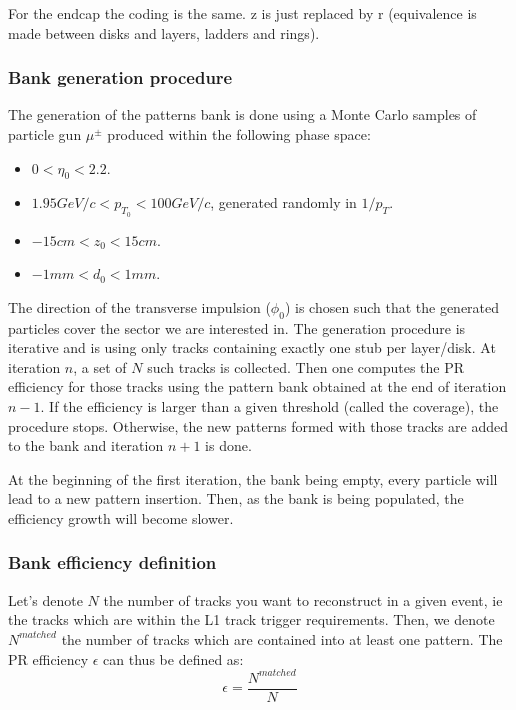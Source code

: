 \noindent For the endcap the coding is the same. z is just replaced by r (equivalence is made between disks and layers, ladders and rings). 

\subsubsection{Bank generation procedure}

\noindent The generation of the patterns bank is done using a Monte Carlo samples of particle gun $\mu^{\pm}$ produced within the following phase space:
\begin{itemize}
\item $0 < \eta_0 < 2.2$.
\item $1.95GeV/c < p_{T_0} < 100GeV/c$, generated randomly in $1/p_T$.
\item $-15cm < z_0 < 15cm$.
 \item $-1mm < d_0 < 1mm$.
\end{itemize}  

\noindent The direction of the transverse impulsion ($\phi_0$) is chosen such that the generated particles cover the sector we are interested in. The generation procedure is iterative and is using only tracks containing exactly one stub per layer/disk. At iteration $n$, a set of $N$ such tracks is collected. Then one computes the PR efficiency for those tracks using the pattern bank obtained at the end of iteration $n-1$. If the efficiency is larger than a given threshold (called the coverage), the procedure stops. Otherwise, the new patterns formed with those tracks are added to the bank and iteration $n+1$ is done. 

\noindent At the beginning of the first iteration, the bank being empty, every particle will lead to a new pattern insertion. Then, as the bank is being populated, the efficiency growth will become slower.

\subsubsection{Bank efficiency definition}

\noindent Let's denote $N$ the number of tracks you want to reconstruct in a given event, ie the tracks which are within the L1 track trigger requirements. Then, we denote $N^{matched}$ the number of tracks which are contained into at least one pattern. The PR efficiency $\epsilon$ can thus be defined as: 
\begin{equation}
\epsilon = \frac{N^{matched}}{N}
\end{equation} 

